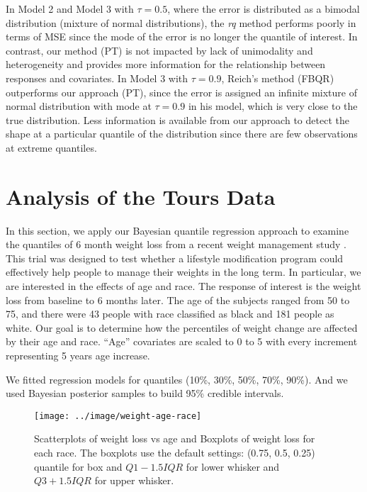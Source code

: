 \documentclass[12pt]{article}
\begin{document}
In Model 2 and Model 3 with $\tau=0.5$, where the error is distributed
as a bimodal distribution (mixture of normal distributions), the
\textit{rq} method performs poorly in terms of MSE since the mode of
the error is no longer the quantile of interest. In contrast, our
method (PT) is not impacted by lack of unimodality and heterogeneity
and provides more information for the relationship between responses
and covariates. In Model 3 with $\tau=0.9$, Reich's method (FBQR)
outperforms our approach (PT), since the error is assigned an infinite
mixture of normal distribution with mode at $\tau=0.9$ in his model,
which is very close to the true distribution. Less information is
available from our approach to detect the shape at a particular
quantile of the distribution since there are few observations at
extreme quantiles.

\section{Analysis of the Tours Data}
\label{sec:tours}
In this section, we apply our Bayesian quantile regression approach to
examine the quantiles of 6 month weight loss from a recent weight
management study \citep{perri2008extended}.  This trial was designed
to test whether a lifestyle modification program could effectively
help people to manage their weights in the long term.  In particular,
we are interested in the effects of age and race.  The response of
interest is the weight loss from baseline to 6 months later. The age
of the subjects ranged from 50 to 75, and there were 43 people with
race classified as black and 181 people as white.  Our goal is to
determine how the percentiles of weight change are affected by their
age and race.  ``Age'' covariates are scaled to 0 to 5 with every
increment representing 5 years age increase.

We fitted regression models for quantiles (10\%, 30\%, 50\%, 70\%,
90\%). And we used Bayesian posterior samples to build 95\% credible
intervals.

\begin{figure}[htbp]
  \centerline{\texttt{[image: ../image/weight-age-race]}}
  \caption[]{\label{fig:tours} Scatterplots of weight loss vs age and
    Boxplots of weight loss for each race.  The boxplots use the
    default settings: (0.75, 0.5, 0.25) quantile for box and
    $Q1-1.5IQR$ for lower whisker and $Q3+1.5IQR$ for upper whisker. }
\end{figure}
\end{document}
